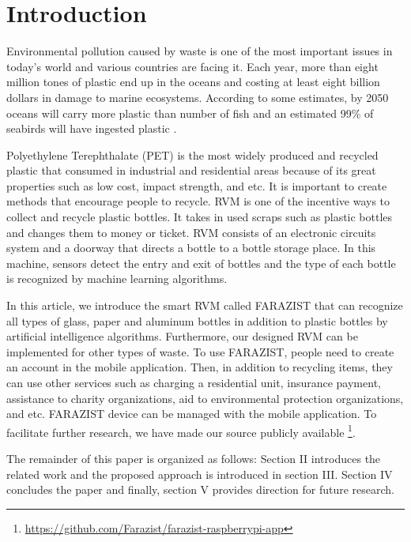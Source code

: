 \documentclass[conference]{IEEEtran}
\begin{document}


\IEEEpeerreviewmaketitle


\section{Introduction}
Environmental pollution caused by waste is one of the most important issues in today's world and various countries are facing it. Each year, more than eight million tones of plastic end up in the oceans and costing at least eight billion dollars in damage to marine ecosystems. According to some estimates, by 2050 oceans will carry more plastic than number of fish and an estimated 99\% of seabirds will have ingested plastic \cite{jakovljevic2020deep}\cite{2020u}.
\par
Polyethylene Terephthalate (PET) is the most widely produced and recycled plastic that consumed in industrial and residential areas because of its great properties such as low cost, impact strength, and etc\cite{zhang2020pet}. It is important to create methods that encourage people to recycle. RVM is one of the incentive ways to collect and recycle plastic bottles. It takes in used scraps such as plastic bottles and changes them to money or ticket\cite{sambhi2020reverse}. RVM consists of an electronic circuits system and a doorway that directs a bottle to a bottle storage place. In this machine, sensors detect the entry and exit of bottles and the type of each bottle is recognized by machine learning algorithms.
\par
In this article, we introduce the smart RVM called FARAZIST that can recognize all types of glass, paper and aluminum bottles in addition to plastic bottles by artificial intelligence algorithms. Furthermore, our designed RVM can be implemented for other types of waste. To use FARAZIST, people need to create an account in the mobile application. Then, in addition to recycling items, they can use other services such as charging a residential unit, insurance payment, assistance to charity organizations, aid to environmental protection organizations, and etc. FARAZIST device can be managed with the mobile application. To facilitate further research, we have made our source publicly available \footnote{\url{https://github.com/Farazist/farazist-raspberrypi-app}}.
\par
The remainder of this paper is organized as follows: Section II introduces the related work and the proposed approach is introduced in section III. Section IV concludes the paper and finally, section V provides direction for future research.
\end{document}
